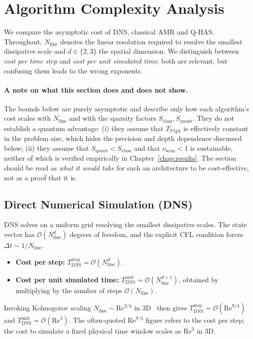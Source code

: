 \documentclass[12pt, a4paper, oneside]{report}
\begin{document}
\section{Algorithm Complexity Analysis}
\label{sec:complexity}

We compare the asymptotic cost of DNS, classical AMR and Q-HAS. Throughout, $N_{\text{fine}}$ denotes the linear resolution required to resolve the smallest dissipative scale and $d \in \{2,3\}$ the spatial dimension. We distinguish between \emph{cost per time step} and \emph{cost per unit simulated time}; both are relevant, but confusing them leads to the wrong exponents.

\paragraph{A note on what this section does and does not show.}
The bounds below are purely asymptotic and describe only how each algorithm's cost scales with $N_{\text{fine}}$ and with the sparsity factors $S_{\text{class}}, S_{\text{quant}}$. They do not establish a quantum advantage: (i) they assume that $T_{\text{VQA}}$ is effectively constant in the problem size, which hides the precision and depth dependence discussed below; (ii) they assume that $S_{\text{quant}} < S_{\text{class}}$ and that $\nu_{\text{scan}} < 1$ is sustainable, neither of which is verified empirically in Chapter~\ref{chap:results}. The section should be read as \emph{what it would take} for such an architecture to be cost-effective, not as a proof that it is.

\subsection*{Direct Numerical Simulation (DNS)}
DNS solves on a uniform grid resolving the smallest dissipative scales. The state vector has $\mathcal{O}(N_{\text{fine}}^d)$ degrees of freedom, and the explicit CFL condition forces $\Delta t \sim 1/N_{\text{fine}}$.
\begin{itemize}
    \item \textbf{Cost per step:} $T_{\text{DNS}}^{\text{step}} = \mathcal{O}(N_{\text{fine}}^d)$.
    \item \textbf{Cost per unit simulated time:} $T_{\text{DNS}}^{\text{unit}} = \mathcal{O}(N_{\text{fine}}^{d+1})$, obtained by multiplying by the number of steps $\mathcal{O}(N_{\text{fine}})$.
\end{itemize}
Invoking Kolmogorov scaling $N_{\text{fine}} \sim \mathrm{Re}^{3/4}$ in 3D~\cite{pope2000} then gives $T^{\text{step}}_{\text{DNS}} = \mathcal{O}(\mathrm{Re}^{9/4})$ and $T^{\text{unit}}_{\text{DNS}} = \mathcal{O}(\mathrm{Re}^{3})$. The often-quoted $\mathrm{Re}^{9/4}$ figure refers to the cost per step; the cost to simulate a fixed physical time window scales as $\mathrm{Re}^{3}$ in 3D.
\end{document}
